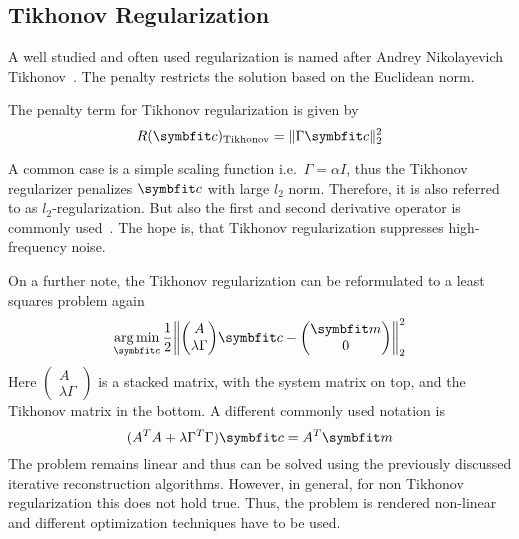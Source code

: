 \subsection{Tikhonov Regularization}\label{subsec:tikhonov_regularization}

A well studied and often used regularization is named after Andrey Nikolayevich
Tikhonov~\cite{tihonov_solution_1963}. The penalty restricts the solution based on the Euclidean
norm.

\begin{definition}\label{def:tikhonov_regularization}
	The penalty term for Tikhonov regularization is given by
	\[
		R(\mvec{c})_{\text{Tikhonov}} = \norm{\Gamma \mvec{c}}_2^2
	\]
\end{definition}
A common case is a simple scaling function i.e.\ \(\Gamma = \alpha I\), thus the Tikhonov
regularizer penalizes \(\mvec{c}\) with large \(l_2\) norm. Therefore, it is also referred to as
\(l_2\)-regularization. But also the first and second derivative operator is commonly
used~\cite{golub_tikhonov_1999}. The hope is, that Tikhonov regularization suppresses high-frequency
noise.

On a further note, the Tikhonov regularization can be reformulated to a least squares problem again
\begin{equation}
	\argmin_{\mvec{c}} \frac{1}{2}
	\left\lVert
	\begin{pmatrix}
		A \\
		\lambda \Gamma
	\end{pmatrix}
	\mvec{c} -
	\begin{pmatrix}
		\mvec{m} \\
		0
	\end{pmatrix}
	\right\rVert_2^2
\end{equation}
Here \(\begin{pmatrix}
	A \\
	\lambda \Gamma
\end{pmatrix}\) is a stacked matrix, with the system matrix on top, and the Tikhonov matrix in the
bottom. A different commonly used notation is
\begin{equation}
	(A^T A + \lambda \Gamma^T \Gamma)\mvec{c} = A^T \mvec{m}
\end{equation}
The problem remains linear and thus can be solved using the previously discussed iterative
reconstruction algorithms. However, in general, for non Tikhonov regularization this does not hold
true. Thus, the problem is rendered non-linear and different optimization techniques have to be
used.

